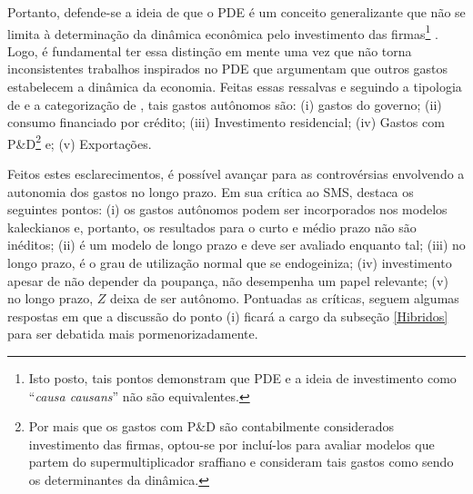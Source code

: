 Portanto, defende-se a ideia de que o PDE é um conceito generalizante que não se limita à determinação da dinâmica econômica pelo investimento das firmas\footnote{
	Isto posto, tais pontos demonstram que PDE e a ideia de investimento como ``\textit{causa causans}'' não são equivalentes.}
\cite{brochier_macroeconomics_2017}. 
Logo, é fundamental ter essa distinção em mente uma vez que não torna inconsistentes trabalhos inspirados no PDE que argumentam que  outros gastos estabelecem a dinâmica da economia.
Feitas essas ressalvas e seguindo a tipologia de \textcite{cesaratto_technical_2003} e a categorização de \textcite{serrano_sraffian_1995}, tais gastos autônomos são: (i) gastos do governo; (ii) consumo financiado por crédito; (iii) Investimento residencial; (iv) Gastos com P\&D\footnote{
	Por mais que os gastos com P\&D são contabilmente considerados investimento das firmas, optou-se por incluí-los para avaliar modelos que partem do supermultiplicador sraffiano e consideram tais gastos como sendo os determinantes da dinâmica.
} e; (v) Exportações.

Feitos estes esclarecimentos, é possível avançar para as controvérsias envolvendo a autonomia dos gastos no longo prazo. 
Em sua crítica ao SMS, \textcite{nikiforos_comments_2018} destaca os seguintes pontos: 
(i) os gastos autônomos podem ser incorporados nos modelos kaleckianos e, portanto, os resultados para o curto e médio prazo não são inéditos; 
(ii) é um modelo de longo prazo e deve ser avaliado enquanto tal; 
(iii) no longo prazo, é o grau de utilização normal que se endogeiniza; 
(iv) investimento apesar de não depender da poupança, não desempenha um papel relevante; 
(v) no longo prazo, $Z$ deixa de ser autônomo.  
Pontuadas as críticas, seguem algumas respostas em que a discussão do ponto (i) ficará a cargo da subseção \ref{Hibridos} para ser debatida mais pormenorizadamente.

